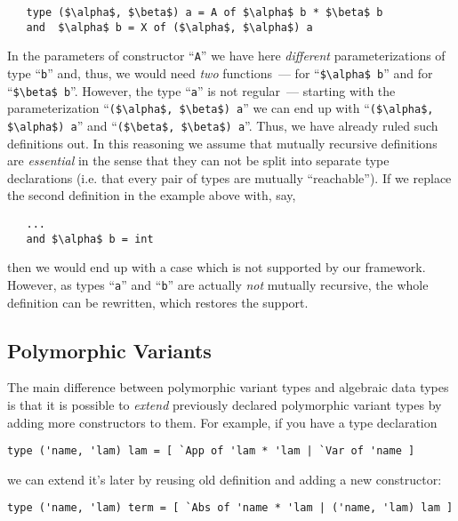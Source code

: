 \begin{lstlisting}
   type ($\alpha$, $\beta$) a = A of $\alpha$ b * $\beta$ b
   and  $\alpha$ b = X of ($\alpha$, $\alpha$) a
\end{lstlisting}

In the parameters of constructor ``\lstinline{A}'' we have here \emph{different} parameterizations of type ``\lstinline{b}'' and, thus, we would need
\emph{two} functions~--- for ``\lstinline{$\alpha$ b}'' and for ``\lstinline{$\beta$ b}''. However, the type ``\lstinline{a}'' is not regular~--- starting with 
the parameterization ``\lstinline{($\alpha$, $\beta$) a}'' we can end up with ``\lstinline{($\alpha$, $\alpha$) a}'' and ``\lstinline{($\beta$, $\beta$) a}''.
Thus, we have already ruled such definitions out. In this reasoning we assume that mutually recursive definitions are \emph{essential} in the sense that they
can not be split into separate type declarations (i.e. that every pair of types are mutually ``reachable''). If we replace the second definition in the
example above with, say,

\begin{lstlisting}
   ...
   and $\alpha$ b = int
\end{lstlisting}

then we would end up with a case which is not supported by our framework. However, as types ``\lstinline{a}'' and ``\lstinline{b}'' are actually \emph{not}
mutually recursive, the whole definition can be rewritten, which restores the support.

\subsection{Polymorphic Variants}
\label{pv}

The main difference between polymorphic variant types and algebraic data types is that it is possible to \emph{extend} previously declared polymorphic variant types by adding more constructors to them. For example, if you have a type declaration 

\begin{lstlisting}
type ('name, 'lam) lam = [ `App of 'lam * 'lam | `Var of 'name ]
\end{lstlisting}

we can extend it's later by reusing old definition and adding a new constructor:
\begin{lstlisting}
type ('name, 'lam) term = [ `Abs of 'name * 'lam | ('name, 'lam) lam ]
\end{lstlisting}

